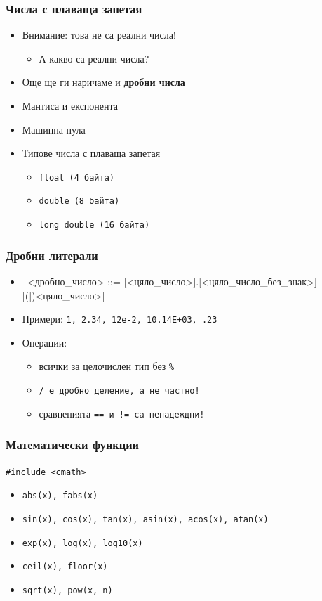 \documentclass{beamer}
\begin{document}
\begin{frame}
  \frametitle{Числа с плаваща запетая}
  \begin{itemize}
  \item \alert{Внимание: това не са реални числа!}
    \begin{itemize}
    \item А какво са реални числа?
    \end{itemize}
  \item Още ще ги наричаме и \textbf{дробни числа}
  \item Мантиса и експонента
  \item Машинна нула
  \item Типове числа с плаваща запетая
    \begin{itemize}
    \item \tt{float} (4 байта)
    \item \tt{double} (8 байта)
    \item \tt{long double} (16 байта)
    \end{itemize}
  \end{itemize}
\end{frame}

\begin{frame}
  \frametitle{Дробни литерали}
  \begin{itemize}
  \item\ <дробно\_число> ::= [<цяло\_число>]\tta.[<цяло\_число\_без\_знак>]\\[0em]
[(|)<цяло\_число>]
  \item Примери: \tt1, \tt{2.34}, \tt{12e-2}, \tt{10.14E+03}, \tt{.23}
  \item Операции:
    \begin{itemize}
    \item всички за целочислен тип \alert{без \tt\%}
    \item \tt/ е \alert{дробно деление}, а не частно!
    \item сравненията \tt{==} и \tt{!=} са \alert{ненадеждни}!
    \end{itemize}
  \end{itemize}
\end{frame}


\begin{frame}[fragile]
  \frametitle{Математически функции}
  \lstinline{#include <cmath>}
  \begin{itemize}
  \item \tt{abs(x)}, \tt{fabs(x)}
  \item \tt{sin(x)}, \tt{cos(x)}, \tt{tan(x)}, \tt{asin(x)}, \tt{acos(x)}, \tt{atan(x)}
  \item \tt{exp(x)}, \tt{log(x)}, \tt{log10(x)}
  \item \tt{ceil(x)}, \tt{floor(x)}
  \item \tt{sqrt(x)}, \tt{pow(x, n)}
  \end{itemize}
\end{frame}
\end{document}
